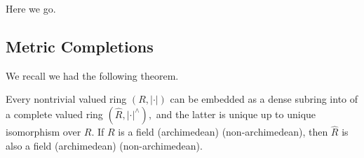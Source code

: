 \documentclass[../notes.tex]{subfiles}
\begin{document}














Here we go.

\subsection{Metric Completions}
We recall we had the following theorem.
\begin{theorem}
	Every nontrivial valued ring $(R,|\cdot|)$ can be embedded as a dense subring into of a complete valued ring $(\hat R,|\cdot|^\wedge),$ and the latter is unique up to unique isomorphism over $R.$ If $R$ is a field (archimedean) (non-archimedean), then $\hat R$ is also a field (archimedean) (non-archimedean).
\end{theorem}
\end{document}
